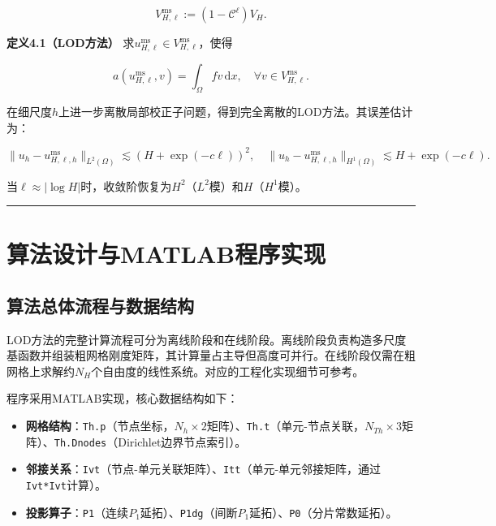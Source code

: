 \documentclass[
]{article}
\providecommand{\tightlist}{%
  \setlength{\itemsep}{0pt}\setlength{\parskip}{0pt}}
\begin{document}
\[
V_{H,\ell}^{\mathrm{ms}} := (1 - \mathcal{C}^\ell)V_H.
\]

\textbf{定义4.1（LOD方法）} 求\(u_{H,\ell}^{\mathrm{ms}} \in V_{H,\ell}^{\mathrm{ms}}\)，使得

\[
a(u_{H,\ell}^{\mathrm{ms}}, v) = \int_\Omega f v \, \mathrm{d}x, \quad \forall v \in V_{H,\ell}^{\mathrm{ms}}.
\]

在细尺度\(h\)上进一步离散局部校正子问题，得到完全离散的LOD方法。其误差估计为：

\[
\|u_h - u_{H,\ell,h}^{\mathrm{ms}}\|_{L^2(\Omega)} \lesssim \left(H + \exp(-c\ell)\right)^2, \quad \|u_h - u_{H,\ell,h}^{\mathrm{ms}}\|_{H^1(\Omega)} \lesssim H + \exp(-c\ell).
\]

当\(\ell \approx |\log H|\)时，收敛阶恢复为\(H^2\)（\(L^2\)模）和\(H\)（\(H^1\)模）。

\begin{center}\rule{0.5\linewidth}{0.5pt}\end{center}

\section{算法设计与MATLAB程序实现}\label{chap-5}

\subsection{算法总体流程与数据结构}\label{chap-5-1}

LOD方法的完整计算流程可分为离线阶段和在线阶段。离线阶段负责构造多尺度基函数并组装粗网格刚度矩阵，其计算量占主导但高度可并行。在线阶段仅需在粗网格上求解约\(N_H\)个自由度的线性系统。对应的工程化实现细节可参考\autocite{engwer2019efficient}。

程序采用MATLAB实现，核心数据结构如下：

\begin{itemize}
\tightlist
\item
  \textbf{网格结构}：\texttt{Th.p}（节点坐标，\(N_h \times 2\)矩阵）、\texttt{Th.t}（单元-节点关联，\(N_{Th} \times 3\)矩阵）、\texttt{Th.Dnodes}（Dirichlet边界节点索引）。
\item
  \textbf{邻接关系}：\texttt{Ivt}（节点-单元关联矩阵）、\texttt{Itt}（单元-单元邻接矩阵，通过\texttt{Ivt\textquotesingle{}*Ivt}计算）。
\item
  \textbf{投影算子}：\texttt{P1}（连续\(P_1\)延拓）、\texttt{P1dg}（间断\(P_1\)延拓）、\texttt{P0}（分片常数延拓）。
\end{itemize}
\end{document}
